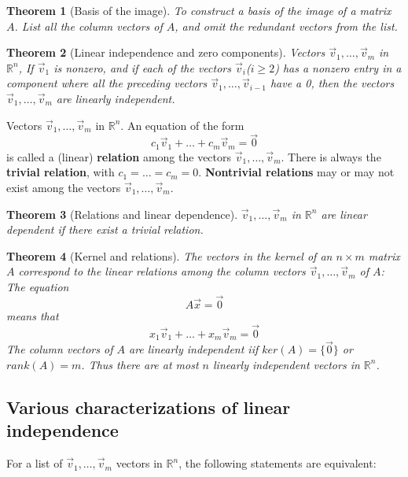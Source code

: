 \documentclass[letter]{article}
\newcommand{\R}{\mathbb{R}}
\newtheorem{theorem}{Theorem}[section]
\newenvironment{definition}[1][Definition]{\begin{trivlist}
\item[\hskip \labelsep {\bfseries #1}]}{\end{trivlist}}
\begin{document}
\begin{theorem}[Basis of the image]
To construct a basis of the image of a matrix $A$. List all the column vectors of $A$, and omit the redundant vectors from the list.
\end{theorem}

\begin{theorem}[Linear independence and zero components]
Vectors $\vec v_1, \ldots, \vec v_m$ in $\R^n$, If $\vec v_1$ is nonzero, and if each of the vectors $\vec v_i$($i\geq 2$) has a nonzero entry in a component where all the preceding vectors  $\vec v_1, \ldots, \vec v_{i-1}$ have a 0, then the vectors $\vec v_1, \ldots, \vec v_m$ are linearly independent.
\end{theorem}

\begin{definition}
Vectors $\vec v_1, \ldots, \vec v_m$ in $\R^n$. An equation of the form
\[
c_1\vec v_1 + \ldots + c_m\vec v_m = \vec 0
\]
is called a (linear) \textbf{relation} among the vectors  $\vec v_1, \ldots, \vec v_m$. There is always the \textbf{trivial relation}, with $c_1 = \ldots = c_m = 0$. \textbf{Nontrivial relations} may or may not exist among the vectors $\vec v_1, \ldots, \vec v_m$.
\end{definition}

\begin{theorem}[Relations and linear dependence]
$\vec v_1, \ldots, \vec v_m$ in $\R^n$ are linear dependent if there exist a trivial relation.
\end{theorem}

\begin{theorem}[Kernel and relations]
The vectors in the kernel of an $n \times m$ matrix $A$ correspond to the linear relations among the column vectors $\vec v_1, \ldots, \vec v_m$ of $A$: The equation
\[
A\vec x = \vec 0
\]
means that
\[
x_1 \vec v_1 + \ldots + x_m \vec v_m = \vec 0
\]
The column vectors of $A$ are linearly independent iif $ker(A) = \{\vec 0\}$ or $rank(A) = m$.
Thus there are at most $n$ linearly independent vectors in $\R^n$.
\end{theorem}

\subsection{Various characterizations of linear independence}
For a list of $\vec v_1,\ldots, \vec v_m$ vectors in $\R^n$, the following statements are equivalent:
\end{document}
